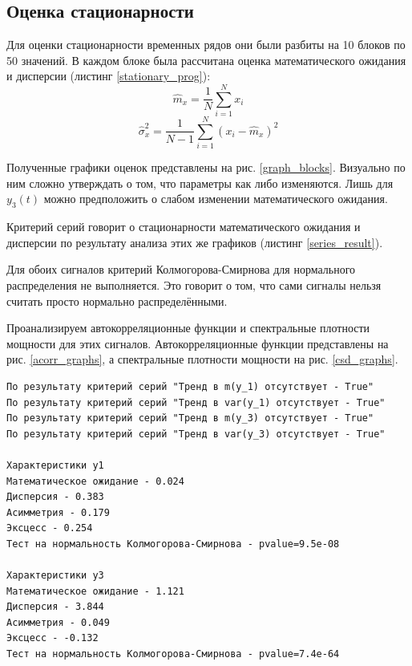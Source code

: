 \subsection{Оценка стационарности}

Для оценки стационарности временных рядов они были разбиты на 10 блоков по 50 значений. В каждом блоке была рассчитана оценка математического ожидания и дисперсии (листинг \ref{stationary_prog}):
\begin{equation}
	\hat{m}_x = \frac{1}{N} \sum_{i=1}^N x_i
\end{equation}
\begin{equation}
	\hat{\sigma}_x^2 = \frac{1}{N-1} \sum_{i=1}^N (x_i - \hat{m}_x)^2 
\end{equation}

Полученные графики оценок представлены на рис. \ref{graph_blocks}. Визуально по ним сложно утверждать о том, что параметры как либо изменяются. Лишь для $y_3(t)$ можно предположить о слабом изменении математического ожидания. 

Критерий серий говорит о стационарности математического ожидания и дисперсии по результату анализа этих же графиков (листинг \ref{series_result}). 

Для обоих сигналов критерий Колмогорова-Смирнова для нормального распределения не выполняется. Это говорит о том, что сами сигналы нельзя считать просто нормально распределёнными.

Проанализируем автокорреляционные функции и спектральные плотности мощности для этих сигналов. Автокорреляционные функции представлены на рис. \ref{acorr_graphs}, а спектральные плотности мощности на рис. \ref{csd_graphs}.

{
	\vspace{-1.5em}
	\label{series_result}
	\begin{verbatim}
По результату критерий серий "Тренд в m(y_1) отсутствует - True"
По результату критерий серий "Тренд в var(y_1) отсутствует - True"
По результату критерий серий "Тренд в m(y_3) отсутствует - True"
По результату критерий серий "Тренд в var(y_3) отсутствует - True"

Характеристики y1
Математическое ожидание - 0.024
Дисперсия - 0.383
Асимметрия - 0.179
Эксцесс - 0.254
Тест на нормальность Колмогорова-Смирнова - pvalue=9.5e-08

Характеристики y3
Математическое ожидание - 1.121
Дисперсия - 3.844
Асимметрия - 0.049
Эксцесс - -0.132
Тест на нормальность Колмогорова-Смирнова - pvalue=7.4e-64
	\end{verbatim}
}

